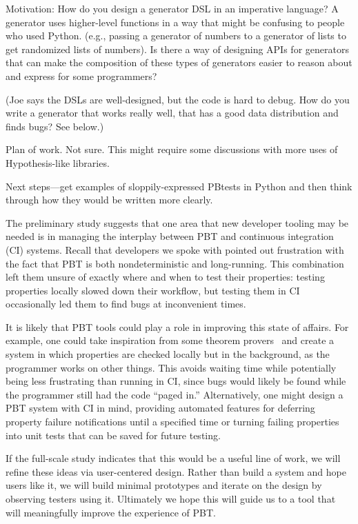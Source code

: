 
Motivation: How do you design a generator DSL in an imperative language? A generator uses higher-level functions in a way that might be confusing to people who used Python.  (e.g., passing a generator of numbers to a generator of lists to get randomized lists of numbers). Is there a way of designing APIs for generators that can make the composition of these types of generators easier to reason about and express for some programmers?

(Joe says the DSLs are well-designed, but the code is hard to debug. How do you write a generator that works really well, that has a good data distribution and finds bugs? See below.)

Plan of work. Not sure. This might require some discussions with more uses of Hypothesis-like libraries.

Next steps—get examples of sloppily-expressed PBtests in Python and then think through how they would be written more clearly.


The preliminary study suggests that one area that new developer tooling may be
needed is in managing the interplay between PBT and continuous integration (CI)
systems. Recall that developers we spoke with pointed out frustration with the
fact that PBT is both nondeterministic and long-running. This combination left
them unsure of exactly where and when to test their properties: testing
properties locally slowed down their workflow, but testing them in CI
occasionally led them to find bugs at inconvenient times.

It is likely that PBT tools could play a role in improving this state of
affairs. For example, one could take inspiration from some theorem
provers~\cite{berghofer2004random} and create a system in which properties are
checked locally but in the background, as the programmer works on other things.
This avoids waiting time while potentially being less frustrating than running
in CI, since bugs would likely be found while the programmer still had the code
``paged in.'' Alternatively, one might design a PBT system with CI in mind,
providing automated features for deferring property failure notifications until
a specified time or turning failing properties into unit tests that can be saved
for future testing.

If the full-scale study indicates that this would be a useful line of work, we
will refine these ideas via user-centered design. Rather than build a system and
hope users like it, we will build minimal prototypes and iterate on the design
by observing testers using it. Ultimately we hope this will guide us to a tool
that will meaningfully improve the experience of PBT.


